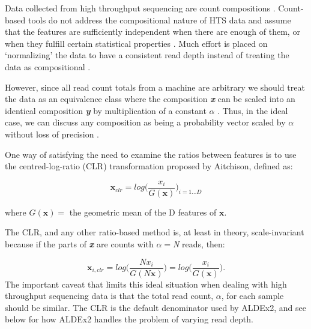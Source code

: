 \documentclass{bmcart}
\begin{document}
Data collected from high throughput sequencing are count compositions \cite{fernandes:2014,gloorAJS:2016}. Count-based tools do not address the compositional nature of HTS data \cite{gloorAJS:2016,fernandes:2014} and assume that the features are sufficiently independent when there are enough of them, or when they fulfill certain statistical properties \cite{Weiss:2016aa}. Much effort is placed on `normalizing' the data to have a consistent read depth instead of treating the data as compositional \cite{Sun:2013aa,McMurdie:2014a}.

However, since all read count totals from a machine are arbitrary we should treat the data as an equivalence class  where the composition \textit{\bf{x}} can be scaled into an identical composition \textit{\textbf{y}} by multiplication of a constant $\alpha$ \cite{barcelo:2001}. Thus, in the ideal case, we can discuss any composition as being a probability vector scaled by $\alpha$ without loss of precision \cite{fernandes:2013}. 

One way of satisfying the need to examine the ratios between features is to use the centred-log-ratio (CLR) transformation proposed by Aitchison, defined as: 

\begin{equation}
\textbf{x}_{clr} = log  \big( \frac{x_i}{G(\textbf{x})}   \big)_{i=1\dots D}
\label{eq:CLR}
\end{equation}

where $G(\textbf{x}) =$ the geometric mean of the D features of $\textbf{x}$.


The CLR, and any other ratio-based method is, at least in theory, scale-invariant because if the parts of \textit{\textbf{x}} are counts with $\alpha=$\textit{N} reads, then: 

\begin{equation}
	\textbf{x}_{i,clr}= log\big( \frac{Nx_i}{G(N\textbf{x})}   \big) =  log\big( \frac{x_i}{G(\textbf{x})}  \big).
\label{eq:equip}
\end{equation}
The  important caveat that limits this ideal situation when dealing with high throughput sequencing data is that the total read count, $\alpha$, for each sample should be similar. The CLR is the default denominator used by ALDEx2, and see below for how ALDEx2 handles the problem of varying read depth.
\end{document}
